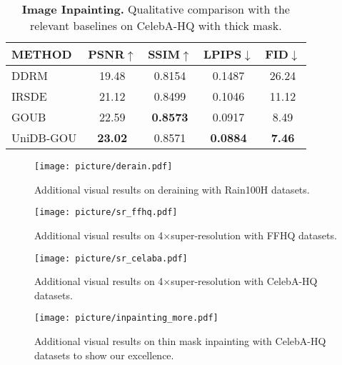 \begin{table}[H]
    
  \centering
  \caption{\textbf{Image Inpainting.} Qualitative comparison with the relevant baselines on CelebA-HQ with thick mask.}
  \label{inpainting_table_thick}
  \vskip 0.05in
  \begin{tabular}{lcccc}
    \toprule
    \textbf{METHOD} & \textbf{PSNR}$\uparrow$ & \textbf{SSIM}$\uparrow$ &  \textbf{LPIPS$\downarrow$}    &  \textbf{FID$\downarrow$}   \\
    \midrule
    DDRM      & 19.48 & 0.8154   & 0.1487  & 26.24     \\  
    IRSDE     & 21.12 & 0.8499   & 0.1046  & 11.12     \\
    GOUB      & 22.59 & \textbf{0.8573}   & 0.0917  & 8.49     \\
    \midrule
    UniDB-GOU & \textbf{23.02} & 0.8571   & \textbf{0.0884}  & \textbf{7.46}     \\ 
    \bottomrule			
  \end{tabular}
\vskip -0.1in
\end{table}



\begin{figure*}[htbp] %
    \centering
    \texttt{[image: picture/derain.pdf]}
    \caption{Additional visual results on deraining with Rain100H datasets.}
\end{figure*}
\vspace{-8mm}

\begin{figure*}[htbp] %
    \centering
    \vspace{-8mm}
    \texttt{[image: picture/sr\_ffhq.pdf]}
    \caption{Additional visual results on 4$\times$super-resolution with FFHQ datasets.}
\end{figure*}




\begin{figure*}[htbp] %
    \centering
    \texttt{[image: picture/sr\_celaba.pdf]}
    \caption{Additional visual results on 4$\times$super-resolution with CelebA-HQ datasets.}
\end{figure*}

\begin{figure*}[htbp] %
    \centering
    \texttt{[image: picture/inpainting\_more.pdf]}
    \caption{Additional visual results on thin mask inpainting with CelebA-HQ datasets to show our excellence.}
\end{figure*}





